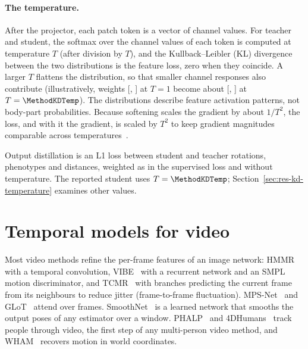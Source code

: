 \paragraph{The temperature.}
After the projector, each patch token is a vector of \BgProjOut{} channel values. For teacher and student, the softmax
over the channel values of each token is computed at temperature $T$ (after division by $T$), and the
Kullback--Leibler (KL) divergence between the two distributions is the feature loss, zero when they coincide. A larger
$T$ flattens the distribution, so that smaller channel responses also contribute (illustratively, weights
[\BgTempExampleHigh, \BgTempExampleLow] at $T=1$ become about [\BgTempExampleSoftHigh, \BgTempExampleSoftLow] at
$T=\MethodKDTemp$). The distributions describe feature activation patterns, not body-part probabilities. Because
softening scales the gradient by about $1/T^2$, the loss, and with it the gradient, is scaled by $T^2$ to keep gradient
magnitudes comparable across temperatures~\cite{hinton2015distilling}.

Output distillation is an L1 loss between student and teacher rotations, phenotypes and distances, weighted as in
the supervised loss and without temperature.
The reported student uses $T=\MethodKDTemp$; Section~\ref{sec:res-kd-temperature} examines other values.

\section{Temporal models for video}
\label{sec:bg-temporal}

Most video methods refine the per-frame features of an image network: HMMR~\cite{kanazawa2019hmmr} with a temporal
convolution, VIBE~\cite{kocabas2020vibe} with a recurrent network and an SMPL motion discriminator, and
TCMR~\cite{choi2021tcmr} with branches predicting the current frame from its neighbours to reduce jitter
(frame-to-frame fluctuation). MPS-Net~\cite{wei2022mpsnet} and GLoT~\cite{shen2023glot} attend over frames.
SmoothNet~\cite{zeng2022smoothnet} is a learned network that smooths the output poses of any estimator over a window.
PHALP~\cite{rajasegaran2022phalp} and 4DHumans~\cite{goel2023humans4d} track people through video, the first step of
any multi-person video method, and WHAM~\cite{shin2024wham} recovers motion in world coordinates.

